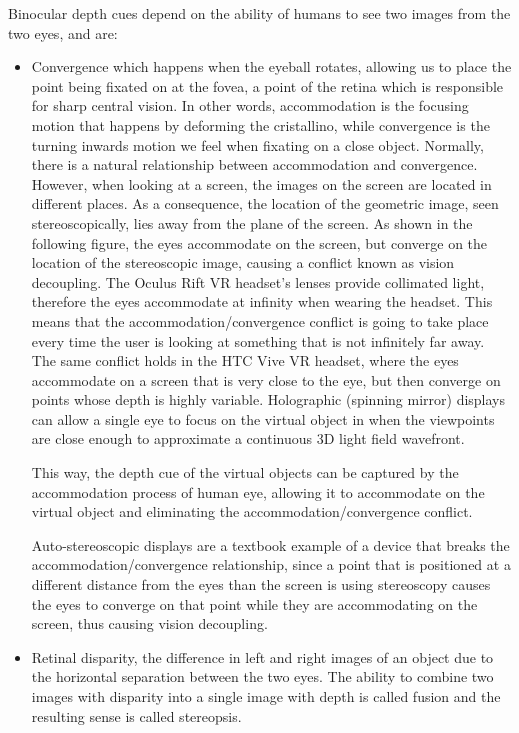 \documentclass[a4paper]{article}
\begin{document}
Binocular depth cues depend on the ability of humans to see two images
from the two eyes, and are:

\begin{itemize}
\item
  Convergence which happens when the eyeball rotates, allowing us to
  place the point being fixated on at the fovea, a point of the retina
  which is responsible for sharp central vision.
In other words,
  accommodation is the focusing motion that happens by deforming the
  cristallino, while convergence is the turning inwards motion we feel
  when fixating on a close object.
Normally, there is a natural
  relationship between accommodation and convergence.
However, when
  looking at a screen, the images on the screen are located in different
  places.
As a consequence, the location of the geometric image, seen
  stereoscopically, lies away from the plane of the screen.
As shown in
  the following figure, the eyes accommodate on the screen, but converge
  on the location of the stereoscopic image, causing a conflict known as
  vision decoupling.
The Oculus Rift VR headset's lenses provide
  collimated light, therefore the eyes accommodate at infinity when
  wearing the headset.
This means that the accommodation/convergence
  conflict is going to take place every time the user is looking at
  something that is not infinitely far away.
The same conflict holds in
  the HTC Vive VR headset, where the eyes accommodate on a screen that
  is very close to the eye, but then converge on points whose depth is
  highly variable.
Holographic (spinning mirror) displays can allow a
  single eye to focus on the virtual object in when the viewpoints are
  close enough to approximate a continuous 3D light field wavefront.

  This way, the depth cue of the virtual objects can be captured by the
  accommodation process of human eye, allowing it to accommodate on the
  virtual object and eliminating the accommodation/convergence conflict.

  Auto-stereoscopic displays are a textbook example of a device that
  breaks the accommodation/convergence relationship, since a point that
  is positioned at a different distance from the eyes than the screen is
  using stereoscopy causes the eyes to converge on that point while they
  are accommodating on the screen, thus causing vision decoupling.

\item
  Retinal disparity, the difference in left and right images of an
  object due to the horizontal separation between the two eyes.
The
  ability to combine two images with disparity into a single image with
  depth is called fusion and the resulting sense is called stereopsis.


\end{itemize}
\end{document}
